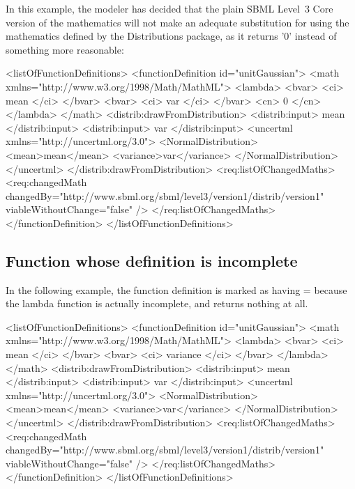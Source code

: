 In this example, the modeler has decided that the plain SBML Level~3 Core version of the mathematics will not make an adequate substitution for using the mathematics defined by the Distributions package, as it returns '0' instead of something more reasonable:

\begin{example}
<listOfFunctionDefinitions> 
  <functionDefinition id="unitGaussian"> 
    <math xmlns="http://www.w3.org/1998/Math/MathML"> 
      <lambda>
        <bvar>
          <ci> mean </ci>
        </bvar>
        <bvar>
          <ci> var </ci>
        </bvar>
        <cn> 0 </cn>
      </lambda>
    </math> 
    <distrib:drawFromDistribution>
      <distrib:input> mean </distrib:input>
      <distrib:input> var </distrib:input>
      <uncertml xmlns="http://uncertml.org/3.0">
         <NormalDistribution>
           <mean>mean</mean>
           <variance>var</variance>
         </NormalDistribution>
      </uncertml>
    </distrib:drawFromDistribution>
    <req:listOfChangedMaths>
      <req:changedMath changedBy="http://www.sbml.org/sbml/level3/version1/distrib/version1"
                            viableWithoutChange="false" />
    </req:listOfChangedMaths>
  </functionDefinition> 
</listOfFunctionDefinitions> 
\end{example} 


\subsection{Function whose definition is incomplete}

In the following example, the function definition is marked as having = because the lambda function is actually incomplete, and returns nothing at all.

\begin{example}
<listOfFunctionDefinitions> 
  <functionDefinition id="unitGaussian"> 
    <math xmlns="http://www.w3.org/1998/Math/MathML"> 
      <lambda>
        <bvar>
          <ci> mean </ci>
        </bvar>
        <bvar>
          <ci> variance </ci>
        </bvar>
      </lambda>
    </math> 
    <distrib:drawFromDistribution>
      <distrib:input> mean </distrib:input>
      <distrib:input> var </distrib:input>
      <uncertml xmlns="http://uncertml.org/3.0">
         <NormalDistribution>
           <mean>mean</mean>
           <variance>var</variance>
         </NormalDistribution>
      </uncertml>
    </distrib:drawFromDistribution>
    <req:listOfChangedMaths>
      <req:changedMath changedBy="http://www.sbml.org/sbml/level3/version1/distrib/version1"
                       viableWithoutChange="false" />
    </req:listOfChangedMaths>
  </functionDefinition> 
</listOfFunctionDefinitions> 
\end{example}

